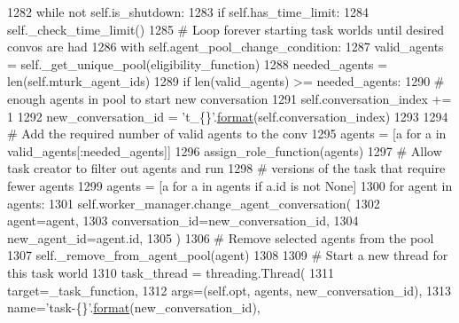 \begin{DoxyCode}
1282         \textcolor{keywordflow}{while} \textcolor{keywordflow}{not} self.is\_shutdown:
1283             \textcolor{keywordflow}{if} self.has\_time\_limit:
1284                 self.\_check\_time\_limit()
1285             \textcolor{comment}{# Loop forever starting task worlds until desired convos are had}
1286             with self.agent\_pool\_change\_condition:
1287                 valid\_agents = self.\_get\_unique\_pool(eligibility\_function)
1288                 needed\_agents = len(self.mturk\_agent\_ids)
1289                 \textcolor{keywordflow}{if} len(valid\_agents) >= needed\_agents:
1290                     \textcolor{comment}{# enough agents in pool to start new conversation}
1291                     self.conversation\_index += 1
1292                     new\_conversation\_id = \textcolor{stringliteral}{'t\_\{\}'}.\hyperlink{namespaceparlai_1_1chat__service_1_1services_1_1messenger_1_1shared__utils_a32e2e2022b824fbaf80c747160b52a76}{format}(self.conversation\_index)
1293 
1294                     \textcolor{comment}{# Add the required number of valid agents to the conv}
1295                     agents = [a \textcolor{keywordflow}{for} a \textcolor{keywordflow}{in} valid\_agents[:needed\_agents]]
1296                     assign\_role\_function(agents)
1297                     \textcolor{comment}{# Allow task creator to filter out agents and run}
1298                     \textcolor{comment}{# versions of the task that require fewer agents}
1299                     agents = [a \textcolor{keywordflow}{for} a \textcolor{keywordflow}{in} agents \textcolor{keywordflow}{if} a.id \textcolor{keywordflow}{is} \textcolor{keywordflow}{not} \textcolor{keywordtype}{None}]
1300                     \textcolor{keywordflow}{for} agent \textcolor{keywordflow}{in} agents:
1301                         self.worker\_manager.change\_agent\_conversation(
1302                             agent=agent,
1303                             conversation\_id=new\_conversation\_id,
1304                             new\_agent\_id=agent.id,
1305                         )
1306                         \textcolor{comment}{# Remove selected agents from the pool}
1307                         self.\_remove\_from\_agent\_pool(agent)
1308 
1309                     \textcolor{comment}{# Start a new thread for this task world}
1310                     task\_thread = threading.Thread(
1311                         target=\_task\_function,
1312                         args=(self.opt, agents, new\_conversation\_id),
1313                         name=\textcolor{stringliteral}{'task-\{\}'}.\hyperlink{namespaceparlai_1_1chat__service_1_1services_1_1messenger_1_1shared__utils_a32e2e2022b824fbaf80c747160b52a76}{format}(new\_conversation\_id),

\end{DoxyCode}
